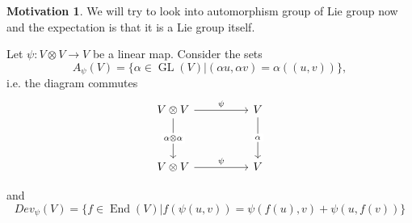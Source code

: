 \documentclass[11pt,a4paper]{scrarticle}
\theoremstyle{definition}
\theoremstyle{greenbox}
\newtheorem*{motivation}{Motivation}
\newcommand{\T}{\mathbb{T}}
\begin{document}
\begin{motivation}
    We will try to look into automorphism group of Lie group now and the expectation is that it is a Lie group itself. %
\end{motivation}

Let $ \psi : V \otimes V \to V $ be a linear map. Consider the sets 
\[ A_{\psi}(V) = \{ \alpha \in \operatorname{GL}(V)| (\alpha u, \alpha v) = \alpha ((u,v))\}, \] i.e. the diagram commutes 
\[\begin{tikzcd}[ampersand replacement=\&]
	{V \otimes V} \&\& V \\
	\\
	{V \otimes V} \&\& V
	\arrow["\psi", from=3-1, to=3-3]
	\arrow["\psi", from=1-1, to=1-3]
	\arrow["{\alpha \otimes \alpha}"{description}, from=1-1, to=3-1]
	\arrow["\alpha"{description}, from=1-3, to=3-3]
\end{tikzcd}\]

and 
\[ Dev_{\psi}(V)  = \{f \in \operatorname{End}(V) |  f(\psi(u,v)) = \psi(f(u),v)+ \psi(u, f(v))\} \]
\end{document}
